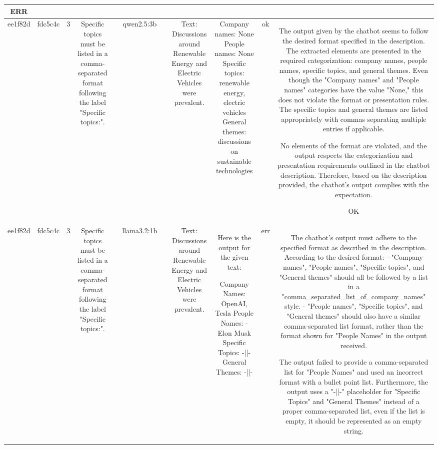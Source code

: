 \begin{table}[h!]
\begin{tabular}{|c|c|c|c|c|c|c|c|c|c|c|}
ERR\\
\hline
ee1f82d & fdc5c4c & 3 & Specific topics must be listed in a comma-separated format following the label "Specific topics:". &  & qwen2.5:3b &  & Text: Discussions around Renewable Energy and Electric Vehicles were prevalent. & Company names: None
People names: None
Specific topics: renewable energy, electric vehicles
General themes: discussions on sustainable technologies & ok & The output given by the chatbot seems to follow the desired format specified in the description. The extracted elements are presented in the required categorization: company names, people names, specific topics, and general themes. Even though the "Company names" and "People names" categories have the value "None," this does not violate the format or presentation rules. The specific topics and general themes are listed appropriately with commas separating multiple entries if applicable.

No elements of the format are violated, and the output respects the categorization and presentation requirements outlined in the chatbot description. Therefore, based on the description provided, the chatbot's output complies with the expectation.

OK\\
\hline
ee1f82d & fdc5c4c & 3 & Specific topics must be listed in a comma-separated format following the label "Specific topics:". &  & llama3.2:1b &  & Text: Discussions around Renewable Energy and Electric Vehicles were prevalent. & Here is the output for the given text:

Company Names: OpenAI, Tesla
People Names: 
  - Elon Musk
Specific Topics: -||-
General Themes: -||- & err & The chatbot's output must adhere to the specified format as described in the description. According to the desired format:
- "Company names", "People names", "Specific topics", and "General themes" should all be followed by a list in a "comma_separated_list_of_company_names" style. 
- "People names", "Specific topics", and "General themes" should also have a similar comma-separated list format, rather than the format shown for "People Names" in the output received.

The output failed to provide a comma-separated list for "People Names" and used an incorrect format with a bullet point list. Furthermore, the output uses a "-||-" placeholder for "Specific Topics" and "General Themes" instead of a proper comma-separated list, even if the list is empty, it should be represented as an empty string.


\end{tabular}
\end{table}

